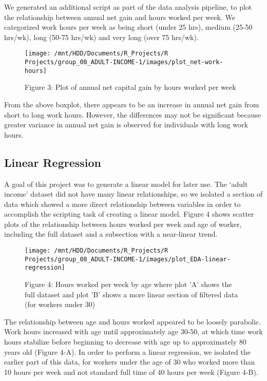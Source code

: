 \documentclass[]{article}
\begin{document}
We generated an additional script as part of the data analysis pipeline,
to plot the relationship between annual net gain and hours worked per
week. We categorized work hours per week as being short (under 25 hrs),
medium (25-50 hrs/wk), long (50-75 hrs/wk) and very long (over 75
hrs/wk).

\begin{figure}

{\centering \texttt{[image: /mnt/HDD/Documents/R\_Projects/R Projects/group\_08\_ADULT-INCOME-1/images/plot\_net-work-hours]} 

}

\caption{Figure 3: Plot of annual net capital gain by hours worked per week}\label{fig:work-hours-plot}
\end{figure}

From the above boxplot, there appears to be an increase in annual net
gain from short to long work hours. However, the differences may not be
significant because greater variance in annual net gain is observed for
individuals with long work hours.

\hypertarget{linear-regression}{%
\subsection{Linear Regression}\label{linear-regression}}

A goal of this project was to generate a linear model for later use. The
`adult income' dataset did not have many linear relationships, so we
isolated a section of data which showed a more direct relationship
between variables in order to accomplish the scripting task of creating
a linear model. Figure 4 shows scatter plots of the relationship between
hours worked per week and age of worker, including the full dataset and
a subsection with a near-linear trend.

\begin{figure}

{\centering \texttt{[image: /mnt/HDD/Documents/R\_Projects/R Projects/group\_08\_ADULT-INCOME-1/images/plot\_EDA-linear-regression]} 

}

\caption{Figure 4: Hours worked per week by age where plot 'A' shows the full dataset and plot 'B' shows a more linear section of filtered data (for workers under 30)}\label{fig:EDA-linear-plot}
\end{figure}

The relationship between age and hours worked appeared to be loosely
parabolic. Work hours increased with age until approximately age 30-50,
at which time work hours stabilize before beginning to decrease with age
up to approximately 80 years old (Figure 4-A). In order to perform a
linear regression, we isolated the earlier part of this data, for
workers under the age of 30 who worked more than 10 hours per week and
not standard full time of 40 hours per week (Figure 4-B).
\end{document}

